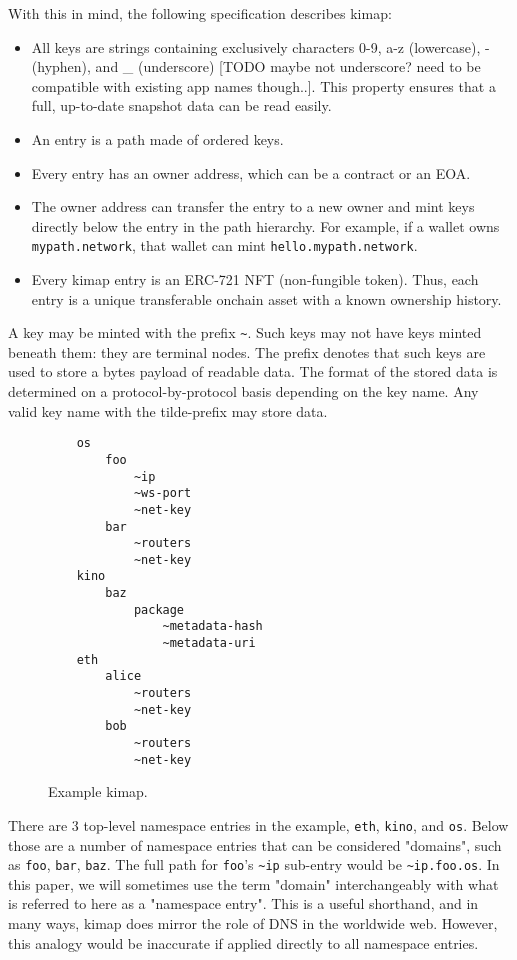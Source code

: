 \documentclass[runningheads]{llncs}
\begin{document}
With this in mind, the following specification describes kimap:

\begin{itemize}
    \item All keys are strings containing exclusively characters 0-9, a-z (lowercase), - (hyphen), and \_ (underscore) [TODO maybe not underscore? need to be compatible with existing app names though..].
    This property ensures that a full, up-to-date snapshot data can be read easily.
    \item An entry is a path made of ordered keys.
    \item Every entry has an owner address, which can be a contract or an EOA.
    \item The owner address can transfer the entry to a new owner and mint keys directly below the entry in the path hierarchy. For example, if a wallet owns \verb|mypath.network|, that wallet can mint \verb|hello.mypath.network|.
    \item Every kimap entry is an ERC-721 NFT (non-fungible token).
    Thus, each entry is a unique transferable onchain asset with a known ownership history.
\end{itemize}

A key may be minted with the prefix \verb|~|. Such keys may not have keys minted beneath them: they are terminal nodes. The prefix denotes that such keys are used to store a bytes payload of readable data. The format of the stored data is determined on a protocol-by-protocol basis depending on the key name. Any valid key name with the tilde-prefix may store data.

\begin{figure}
    \centering
    \begin{lstlisting}
    os
        foo
            ~ip
            ~ws-port
            ~net-key
        bar
            ~routers
            ~net-key
    kino
        baz
            package
                ~metadata-hash
                ~metadata-uri
    eth
        alice
            ~routers
            ~net-key
        bob
            ~routers
            ~net-key
    \end{lstlisting}
    \caption{Example kimap.}
    \label{fig:example kimap}
\end{figure}

There are 3 top-level namespace entries in the example, \verb|eth|, \verb|kino|, and \verb|os|.
Below those are a number of namespace entries that can be considered "domains", such as \verb|foo|, \verb|bar|, \verb|baz|.
The full path for \verb|foo|'s \verb|~ip| sub-entry would be \verb|~ip.foo.os|.
In this paper, we will sometimes use the term "domain" interchangeably with what is referred to here as a "namespace entry".
This is a useful shorthand, and in many ways, kimap does mirror the role of DNS in the worldwide web.
However, this analogy would be inaccurate if applied directly to all namespace entries.
\end{document}

